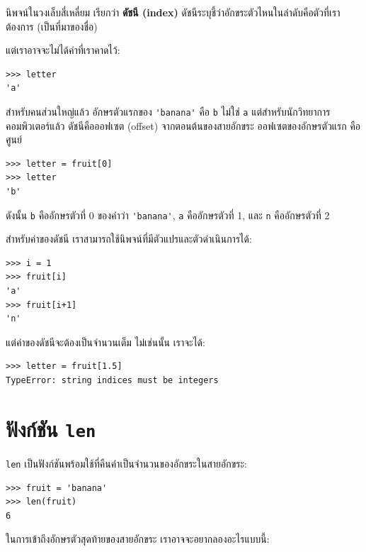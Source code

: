 นิพจน์ในวงเล็บสี่เหลี่ยม เรียกว่า {\bf ดัชนี (index)}
ดัชนีระบุชี้ว่าอักขระตัวไหนในลำดับคือตัวที่เราต้องการ (เป็นที่มาของชื่อ)

แต่เราอาจจะไม่ได้ค่าที่เราคาดไว้:

\begin{verbatim}
>>> letter
'a'
\end{verbatim}
%
สำหรับคนส่วนใหญ่แล้ว อักษรตัวแรกของ \verb"'banana'" คือ {\tt b} ไม่ใช่ {\tt a}
แต่สำหรับนักวิทยาการคอมพิวเตอร์แล้ว ดัชนีคือออฟเซต (offset) จากตอนต้นของสายอักขระ
ออฟเซตของอักษรตัวแรก คือ ศูนย์

\begin{verbatim}
>>> letter = fruit[0]
>>> letter
'b'
\end{verbatim}
%
ดังนั้น {\tt b} คืออักษรตัวที่ 0 ของคำว่า \verb"'banana'", {\tt a} คืออักษรตัวที่ 1, และ {\tt n} คืออักษรตัวที่ 2

สำหรับค่าของดัชนี เราสามารถใช้นิพจน์ที่มีตัวแปรและตัวดำเนินการได้:

\begin{verbatim}
>>> i = 1
>>> fruit[i]
'a'
>>> fruit[i+1]
'n'
\end{verbatim}
%

แต่ค่าของดัชนีจะต้องเป็นจำนวนเต็ม ไม่เช่นนั้น เราจะได้:

\begin{verbatim}
>>> letter = fruit[1.5]
TypeError: string indices must be integers
\end{verbatim}
%

\section{ฟังก์ชัน {\tt len}}

{\tt len} เป็นฟังก์ชันพร้อมใช้ที่คืนค่าเป็นจำนวนของอักขระในสายอักขระ:

\begin{verbatim}
>>> fruit = 'banana'
>>> len(fruit)
6
\end{verbatim}
%
ในการเข้าถึงอักษรตัวสุดท้ายของสายอักขระ เราอาจจะอยากลองอะไรแบบนี้:

